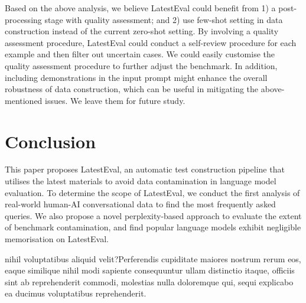 \documentclass[letterpaper]{article} %
\begin{document}
Based on the above analysis, we believe LatestEval could benefit from 1) a post-processing stage with quality assessment; and 2) use few-shot setting in data construction instead of the current zero-shot setting. By involving a quality assessment procedure, LatestEval could conduct a self-review procedure for each example and then filter out uncertain cases. We could easily customise the quality assessment procedure to further adjust the benchmark. In addition, including demonstrations in the input prompt might enhance the overall robustness of data construction, which can be useful in mitigating the above-mentioned issues. We leave them for future study.

\section{Conclusion}

This paper proposes LatestEval, an automatic test construction pipeline that utilises the latest materials to avoid data contamination in language model evaluation. To determine the scope of LatestEval, we conduct the first analysis of real-world human-AI conversational data to find the most frequently asked queries. We also propose a novel perplexity-based approach to evaluate the extent of benchmark contamination, and find popular language models exhibit negligible memorisation on LatestEval.

\nocite{li2023compressing,li2023unlocking}

 nihil voluptatibus aliquid velit?Perferendis cupiditate maiores nostrum rerum eos, eaque similique nihil modi sapiente consequuntur ullam distinctio itaque, officiis sint ab reprehenderit commodi, molestias nulla doloremque qui, sequi explicabo ea ducimus voluptatibus reprehenderit.\clearpage

\end{document}
